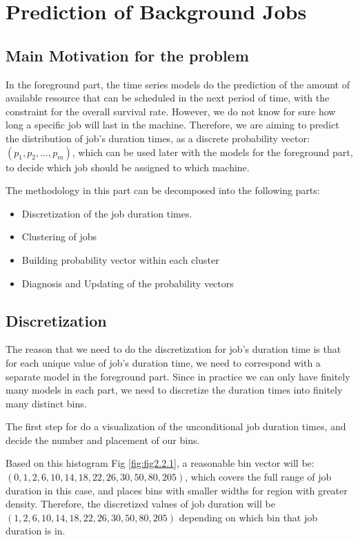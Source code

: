\documentclass{article}
\begin{document}
\section{Prediction of Background Jobs}
\subsection{Main Motivation for the problem}

\begin{flushleft}
In the foreground part, the time series models do the prediction of the amount of available resource that can be scheduled in the next period of time, with the constraint for the overall survival rate. However, we do not know for sure how long a specific job will last in the machine. Therefore, we are aiming to predict the distribution of job's duration times, as a discrete probability vector:
$(p_1, p_2, ..., p_m)$, which can be used later with the models for the foreground part, to decide which job should be assigned to which machine.
\end{flushleft}

\begin{flushleft}
The methodology in this part can be decomposed into the following parts:
\begin{itemize}
    \item Discretization of the job duration times.
    \item Clustering of jobs
    \item Building probability vector within each cluster
    \item Diagnosis and Updating of the probability vectors
\end{itemize}
\end{flushleft}

\subsection{Discretization}

\begin{flushleft}
The reason that we need to do the discretization for job's duration time is that for each unique value of job's duration time, we need to correspond with a separate model in the foreground part. Since in practice we can only have finitely many models in each part, we need to discretize the duration times into finitely many distinct bins.

The first step for do a visualization of the unconditional job duration times, and decide the number and placement of our bins.

Based on this histogram Fig \ref{fig:fig2.2.1}, a reasonable bin vector will be:\newline $(0,1,2,6,10,14,18,22,26,30,50,80,205)$,
which covers the full range of job duration in this case, and places bins with smaller widths for region with greater density. Therefore, the discretized values of job duration will be\newline $(1,2,6,10,14,18,22,26,30,50,80,205)$ depending on which bin that job duration is in.
\end{flushleft}
\end{document}
